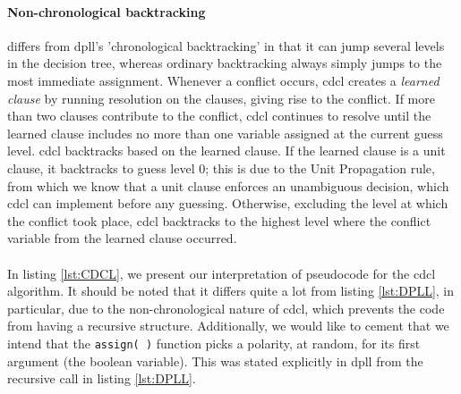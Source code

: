 \paragraph{Non-chronological backtracking} differs from \acrshort{dpll}'s 'chronological backtracking' in that it can jump several levels in the decision tree, whereas ordinary backtracking always simply jumps to the most immediate assignment. Whenever a conflict occurs, \acrshort{cdcl} creates a \emph{learned clause} by running resolution on the clauses, giving rise to the conflict. If more than two clauses contribute to the conflict, \acrshort{cdcl} continues to resolve until the learned clause includes no more than one variable assigned at the current guess level. \acrshort{cdcl} backtracks based on the learned clause. If the learned clause is a unit clause, it backtracks to guess level \(0\); this is due to the Unit Propagation rule, from which we know that a unit clause enforces an unambiguous decision, which \acrshort{cdcl} can implement before any guessing. Otherwise, excluding the level at which the conflict took place, \acrshort{cdcl} backtracks to the highest level where the conflict variable from the learned clause occurred.
\\
\\
In listing \ref{lst:CDCL}, we present our interpretation of pseudocode for the \acrshort{cdcl} algorithm. It should be noted that it differs quite a lot from listing \ref{lst:DPLL}, in particular, due to the non-chronological nature of \acrshort{cdcl}, which prevents the code from having a recursive structure. Additionally, we would like to cement that we intend that the \texttt{assign( )} function picks a polarity, at random, for its first argument (the boolean variable). This was stated explicitly in \acrshort{dpll} from the recursive call in listing \ref{lst:DPLL}. 

